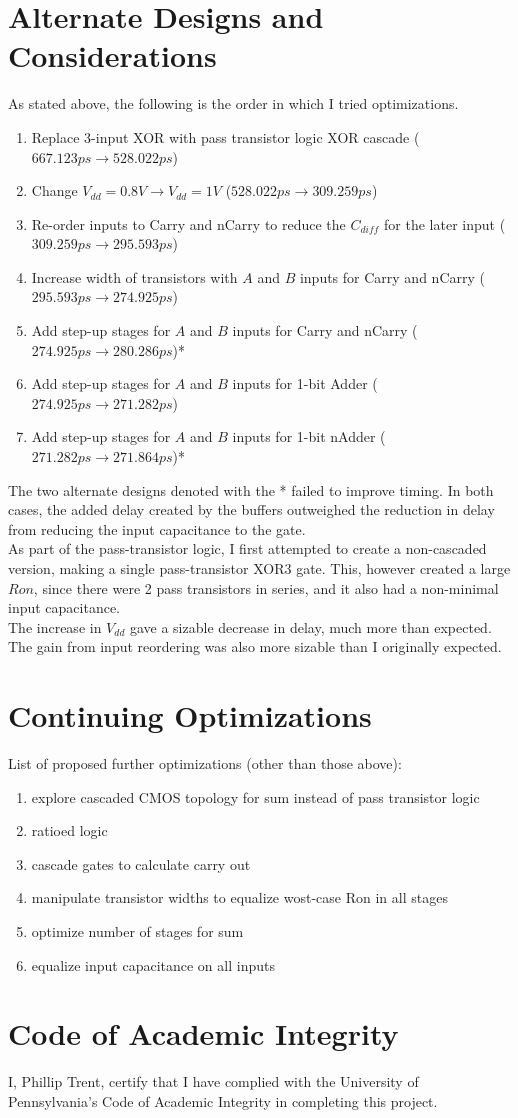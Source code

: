 \documentclass{article}
\begin{document}
\section{Alternate Designs and Considerations}
As stated above, the following is the order in which I tried optimizations. 
\begin{enumerate}
\item Replace 3-input XOR with pass transistor logic XOR cascade ($667.123ps \rightarrow 528.022ps$)
\item Change $V_{dd} = 0.8V \rightarrow V_{dd} = 1V$ ($528.022ps \rightarrow 309.259ps$)
\item Re-order inputs to Carry and nCarry to reduce the $C_{diff}$ for the later input ($309.259ps \rightarrow 295.593ps$)
\item Increase width of transistors with $A$ and $B$ inputs for Carry and nCarry  ($295.593ps \rightarrow 274.925ps$)
\item Add step-up stages for $A$ and $B$ inputs for Carry and nCarry  ($274.925ps \rightarrow 280.286ps$)*
\item Add step-up stages for $A$ and $B$ inputs for 1-bit Adder  ($274.925ps \rightarrow 271.282ps$)
\item Add step-up stages for $A$ and $B$ inputs for 1-bit nAdder  ($271.282ps \rightarrow 271.864ps$)*
\end{enumerate}
The two alternate designs denoted with the * failed to improve timing. In both cases, the added delay created by the buffers outweighed the reduction in delay from reducing the input capacitance to the gate.\\
As part of the pass-transistor logic, I first attempted to create a non-cascaded version, making a single pass-transistor XOR3 gate. This, however created a large $Ron$, since there were 2 pass transistors in series, and it also had a non-minimal input capacitance.\\
The increase in $V_{dd}$ gave a sizable decrease in delay, much more than expected. The gain from input reordering was also more sizable than I originally expected. 

\section{Continuing Optimizations}
List of proposed further optimizations (other than those above):
\begin{enumerate}
\item explore cascaded CMOS topology for sum instead of pass transistor logic
\item ratioed logic
\item cascade gates to calculate carry out
\item manipulate transistor widths to equalize wost-case Ron in all stages
\item optimize number of stages for sum
\item equalize input capacitance on all inputs
\end{enumerate}

\section{Code of Academic Integrity}
I, Phillip Trent, certify that I have complied with the University of Pennsylvania’s Code of Academic Integrity in completing this project.
\end{document}
